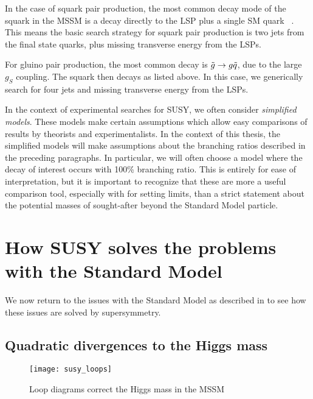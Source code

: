In the case of squark pair production, the most common decay mode of the squark in the MSSM is a decay directly to the LSP plus a single SM quark ~\cite{susyPrimer}.
This means the basic search strategy for squark pair production is two jets from the final state quarks, plus missing transverse energy from the LSPs.

For gluino pair production, the most common decay is $\tilde{g} \rightarrow g \tilde{q}$, due to the large $g_S$ coupling.
The squark then decays as listed above.
In this case, we generically search for four jets and missing transverse energy from the LSPs.

In the context of experimental searches for SUSY, we often consider \textit{simplified models}.
These models make certain assumptions which allow easy comparisons of results by theorists and experimentalists.
In the context of this thesis, the simplified models will make assumptions about the branching ratios described in the preceding paragraphs.
In particular, we will often choose a model where the decay of interest occurs with 100\% branching ratio.
This is entirely for ease of interpretation, but it is important to recognize that these are more a useful comparison tool, especially with for setting limits, than a strict statement about the potential masses of sought-after beyond the Standard Model particle.

\section{How SUSY solves the problems with the Standard Model}

We now return to the issues with the Standard Model as described in  to see how these issues are solved by supersymmetry.

\subsection{Quadratic divergences to the Higgs mass}

\begin{figure}
\caption{Loop diagrams correct the Higgs mass in the MSSM}\label{fig:susy_loops}
\texttt{[image: susy\_loops]}
\end{figure}


